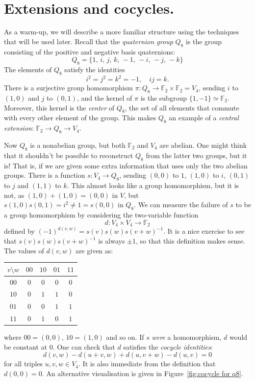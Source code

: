 \documentclass{article}
\theoremstyle{plain}
\theoremstyle{definition}
\def \FF {\mathbb{F}}
\begin{document}
\section{Extensions and cocycles.}

As a warm-up, we will describe a more familiar structure using the techniques that will be used later. 
Recall that the \emph{quaternion group} $Q_8$ is the group consisting of the positive and negative basis quaternions:
\[
	Q_8 = \{1,\, i,\, j,\, k,\,-1,\, -i,\, -j,\, -k\}
\]
The elements of $Q_8$ satisfy the identities
\[
	i^2 = j^2 = k^2 = -1, \quad ij=k.
\]
There is a surjective group homomorphism $\pi\colon Q_8 \to \FF_2 \times \FF_2 = V_4$, sending $i$ to $(1,0)$ and $j$ to $(0,1)$, and the kernel of $\pi$ is the subgroup $\{1,-1\}\simeq \FF_2$.
Moreover, this kernel is the \emph{center} of $Q_8$, the set of all elements that commute with every other element of the group. This makes $Q_8$ an example of a \emph{central extension}: $\FF_2\to Q_8 \to V_4$.

Now $Q_8$ is a nonabelian group, but both $\FF_2$ and $V_4$ are abelian.
One might think that it shouldn't be possible to reconstruct $Q_8$ from the latter two groups, but it is! 
That is, if we are given some extra information that uses only the two abelian groups.
There is a function $s\colon V_4 \to Q_8$, sending $(0,0)$ to $1$, $(1,0)$ to $i$, $(0,1)$ to $j$ and $(1,1)$ to $k$.
This almost looks like a group homomorphism, but it is not, as $(1,0) + (1,0) = (0,0)$ in $V$, but $s(1,0)s(0,1) = i^2 \not= 1 = s(0,0)$ in $Q_8$.
We can measure the failure of $s$ to be a group homomorphism by considering the two-variable function
\[
	d\colon V_4 \times V_4 \to \FF_2
\]
defined by $ (-1)^{d(v,w)} = s(v)s(w)s(v+w)^{-1}$. 
It is a nice exercise to see that $s(v)s(w)s(v+w)^{-1}$ is always $\pm 1$, so that this definition makes sense. The values of $d(v,w)$ are given as:

\begin{center}
\begin{tabular*}{0.35\textwidth}{c|cccc}
$v\setminus w$&$00$&$10$&$01$&$11$\\
\hline
	$00$		& $0$& $0$& $0$& $0$\\
	$10$		& $0$& $1$& $1$& $0$\\
	$01$		& $0$& $0$& $1$& $1$\\
	$11$		& $0$& $1$& $0$& $1$\\
\end{tabular*}
\end{center}
where $00=(0,0)$, $10=(1,0)$ and so on.
If $s$ \emph{were} a homomorphism, $d$ would be constant at $0$.
One can check that $d$ satisfies the \emph{cocycle identities}:
\[
	d(v,w)-d(u+v,w)+d(u,v+w)-d(u,v) = 0
\]
for all triples $u,v,w\in V_4$. It is also immediate from the definition that $d(0,0)=0$.
An alternative visualisation is given in Figure~\ref{fig:cocycle for q8}.
\end{document}
